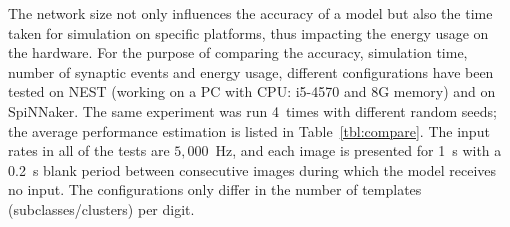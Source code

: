 The network size not only influences the accuracy of a model but also the time taken for simulation on specific platforms, thus impacting the energy usage on the hardware.
For the purpose of comparing the accuracy, simulation time, number of synaptic events and energy usage, different configurations have been tested on NEST (working on a PC with CPU: i5-4570 and 8G memory) and on SpiNNaker.
The same experiment was run 4~times with different random seeds; the average performance estimation is listed in Table~\ref{tbl:compare}.
The input rates in all of the tests are $5,000$~Hz, and each image is presented for 1~s with a 0.2~s blank period between consecutive images during which the model receives no input.
The configurations only differ in the number of templates (subclasses/clusters) per digit.

